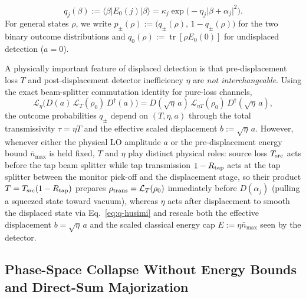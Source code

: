 \documentclass{iopjournal}
\newcommand{\tr}{\operatorname{tr}}
\newcommand{\nbar}{\bar n_{\max}}
\newcommand{\ket}[1]{\lvert #1\rangle}
\newcommand{\bra}[1]{\langle #1\rvert}
\newcommand{\abs}[1]{\lvert #1\rvert}
\newcommand{\calL}{\mathcal{L}}
\begin{document}
\begin{equation}\label{eq:q-coherent}
q_j(\beta) := \bra{\beta} E_0(j) \ket{\beta} = \kappa_j \exp\!\bigl(-\eta_j \abs{\beta + \alpha_j}^2\bigr).
\end{equation}
For general states $\rho$, we write $p_\pm(\rho) := \bigl(q_\pm(\rho),\, 1 - q_\pm(\rho)\bigr)$ for the two binary outcome distributions and $q_0(\rho) := \tr[\rho E_0(0)]$ for undisplaced detection ($a = 0$).

A physically important feature of displaced detection is that pre-displacement loss $T$ and post-displacement detector inefficiency $\eta$ are \emph{not interchangeable}. Using the exact beam-splitter commutation identity for pure-loss channels,
\begin{equation}\label{eq:commutation}
\calL_\eta\!\bigl(D(a)\,\calL_T(\rho_0)\,D^\dagger(a)\bigr) = D(\sqrt{\eta}\,a)\,\calL_{\eta T}(\rho_0)\,D^\dagger(\sqrt{\eta}\,a),
\end{equation}
the outcome probabilities $q_\pm$ depend on $(T,\eta,a)$ through the total transmissivity $\tau = \eta T$ and the effective scaled displacement $b := \sqrt{\eta}\,a$. However, whenever either the physical LO amplitude $a$ or the pre-displacement energy bound $\nbar$ is held fixed, $T$ and $\eta$ play distinct physical roles: source loss $T_{\rm src}$ acts before the tap beam splitter while tap transmission $1 - R_{\rm tap}$ acts at the tap splitter between the monitor pick-off and the displacement stage, so their product $T = T_{\rm src}(1 - R_{\rm tap})$ prepares $\rho_{\rm trans} = \calL_T(\rho_0)$ immediately before $D(\alpha_j)$ (pulling a squeezed state toward vacuum), whereas $\eta$ acts after displacement to smooth the displaced state via Eq.~\eqref{eq:q-husimi} and rescale both the effective displacement $b = \sqrt{\eta}\,a$ and the scaled classical energy cap $E := \eta\nbar$ seen by the detector.

\subsection{Phase-Space Collapse Without Energy Bounds and Direct-Sum Majorization}\label{subsec:lemma1}
\end{document}

